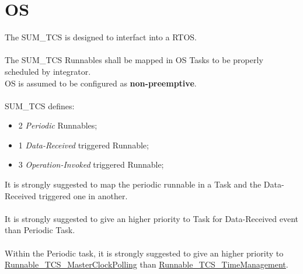 \section{OS}
The SUM\_TCS is designed to interfact into a RTOS.
\\
\\
The SUM\_TCS Runnables shall be mapped in OS Tasks to be properly scheduled by integrator.
\\
OS is assumed to be configured as \textbf{non-preemptive}.
\\
\\
SUM\_TCS defines:
\begin{itemize}
	\item 2 \textit{Periodic} Runnables;
	\item 1 \textit{Data-Received} triggered Runnable;
	\item 3 \textit{Operation-Invoked} triggered Runnable;
\end{itemize}

It is strongly suggested to map the periodic runnable in a Task and the Data-Received triggered one in another.
\\
\\
It is strongly suggested to give an higher priority to Task for Data-Received event than Periodic Task.
\\
\\
Within the Periodic task, it is strongly suggested to give an higher priority to \hyperref[subsec:Runnable_TCS_MasterClockPolling]{Runnable_TCS_MasterClockPolling} 
than \hyperref[subsec:Runnable_TCS_TimeManagement]{Runnable_TCS_TimeManagement}.

